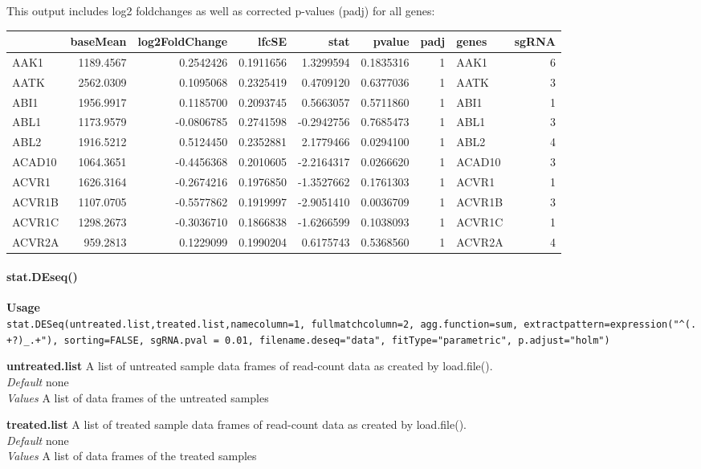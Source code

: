 \documentclass[]{article}
\let\oldparagraph\paragraph
\renewcommand{\paragraph}[1]{\oldparagraph{#1}\mbox{}}
\begin{document}
This output includes log2 foldchanges as well as corrected p-values
(padj) for all genes:

\begin{longtable}[c]{@{}lrrrrrrlr@{}}
\toprule
& baseMean & log2FoldChange & lfcSE & stat & pvalue & padj & genes &
sgRNA\tabularnewline
\midrule
\endhead
AAK1 & 1189.4567 & 0.2542426 & 0.1911656 & 1.3299594 & 0.1835316 & 1 &
AAK1 & 6\tabularnewline
AATK & 2562.0309 & 0.1095068 & 0.2325419 & 0.4709120 & 0.6377036 & 1 &
AATK & 3\tabularnewline
ABI1 & 1956.9917 & 0.1185700 & 0.2093745 & 0.5663057 & 0.5711860 & 1 &
ABI1 & 1\tabularnewline
ABL1 & 1173.9579 & -0.0806785 & 0.2741598 & -0.2942756 & 0.7685473 & 1 &
ABL1 & 3\tabularnewline
ABL2 & 1916.5212 & 0.5124450 & 0.2352881 & 2.1779466 & 0.0294100 & 1 &
ABL2 & 4\tabularnewline
ACAD10 & 1064.3651 & -0.4456368 & 0.2010605 & -2.2164317 & 0.0266620 & 1
& ACAD10 & 3\tabularnewline
ACVR1 & 1626.3164 & -0.2674216 & 0.1976850 & -1.3527662 & 0.1761303 & 1
& ACVR1 & 1\tabularnewline
ACVR1B & 1107.0705 & -0.5577862 & 0.1919997 & -2.9051410 & 0.0036709 & 1
& ACVR1B & 3\tabularnewline
ACVR1C & 1298.2673 & -0.3036710 & 0.1866838 & -1.6266599 & 0.1038093 & 1
& ACVR1C & 1\tabularnewline
ACVR2A & 959.2813 & 0.1229099 & 0.1990204 & 0.6175743 & 0.5368560 & 1 &
ACVR2A & 4\tabularnewline
\bottomrule
\end{longtable}

\paragraph{stat.DEseq()}\label{stat.deseq}

\textbf{Usage}\\
\texttt{stat.DESeq(untreated.list,treated.list,namecolumn=1,\ fullmatchcolumn=2,\ agg.function=sum,\ extractpattern=expression("\^{}(.+?)\_.+"),\ sorting=FALSE,\ sgRNA.pval\ =\ 0.01,\ filename.deseq="data",\ fitType="parametric",\ p.adjust="holm")}

\textbf{untreated.list} A list of untreated sample data frames of
read-count data as created by load.file().\\
\emph{Default} none\\
\emph{Values} A list of data frames of the untreated samples

\textbf{treated.list} A list of treated sample data frames of read-count
data as created by load.file().\\
\emph{Default} none\\
\emph{Values} A list of data frames of the treated samples
\end{document}
